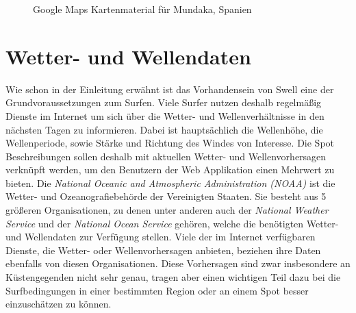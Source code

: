 \begin{figure}[h]
  \caption{Google Maps Kartenmaterial für Mundaka, Spanien}
  \label{google-maps}
\end{figure}

\section{Wetter- und Wellendaten}
\label{sec:Wetter- und Wellendaten}

Wie schon in der Einleitung erwähnt ist das Vorhandensein von Swell
eine der Grundvoraussetzungen zum Surfen. Viele Surfer nutzen deshalb
regelmäßig Dienste im Internet um sich über die Wetter- und
Wellenverhältnisse in den nächsten Tagen zu informieren. Dabei ist
hauptsächlich die Wellenhöhe, die Wellenperiode, sowie Stärke und
Richtung des Windes von Interesse. Die Spot Beschreibungen sollen
deshalb mit aktuellen Wetter- und Wellenvorhersagen verknüpft werden,
um den Benutzern der Web Applikation einen Mehrwert zu bieten. Die
\textit{National Oceanic and Atmospheric Administration (NOAA)} ist
die Wetter- und Ozeanografiebehörde der Vereinigten Staaten. Sie
besteht aus 5 größeren Organisationen, zu denen unter anderen auch der
\textit{National Weather Service} und der \textit{National Ocean
  Service} gehören, welche die benötigten Wetter- und Wellendaten zur
Verfügung stellen. Viele der im Internet verfügbaren Dienste, die
Wetter- oder Wellenvorhersagen anbieten, beziehen ihre Daten ebenfalls
von diesen Organisationen. Diese Vorhersagen sind zwar insbesondere an
Küstengegenden nicht sehr genau, tragen aber einen wichtigen Teil dazu
bei die Surfbedingungen in einer bestimmten Region oder an einem Spot
besser einzuschätzen zu können.

